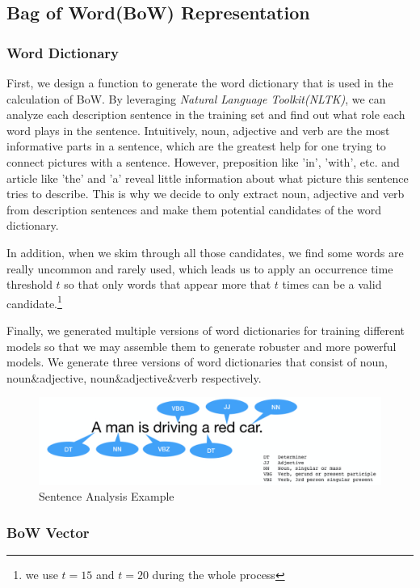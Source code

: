 \documentclass{article}
\begin{document}
\subsection{Bag of Word(BoW) Representation }
\subsubsection{Word Dictionary}

First, we design a function to generate the word dictionary that is used in the calculation of BoW. By leveraging \emph{Natural Language Toolkit(NLTK)}, we can analyze each description sentence in the training set and find out what role each word plays in the sentence. Intuitively, noun, adjective and verb are the most informative parts in a sentence, which are the greatest help for one trying to connect pictures with a sentence. However, preposition like 'in', 'with', etc. and article like 'the' and 'a' reveal little information about what picture this sentence tries to describe. This is why we decide to only extract noun, adjective and verb from description sentences and make them potential candidates of the word dictionary.

In addition, when we skim through all those candidates, we find some words are really uncommon and rarely used, which leads us to apply an occurrence time threshold $t$ so that only words that appear more that $t$ times can be a valid candidate.\footnote{we use $t=15$ and $t=20$ during the whole process}

Finally, we generated multiple versions of word dictionaries for training different models so that we may assemble them to generate robuster and more powerful models. We generate three versions of word dictionaries that consist of noun, noun\&adjective, noun\&adjective\&verb respectively.
\begin{figure}[h]
  \centering
  \includegraphics[width=\textwidth]{SentenceAnalysis}
  \caption{Sentence Analysis Example}
\end{figure}

\subsubsection{BoW Vector}
\end{document}
